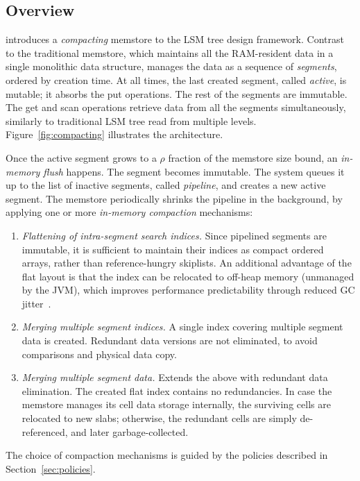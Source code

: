 \subsection{Overview}

\begin{figure*}
\caption{\bf{LSM architecture based on compacting memstore.}}
\label{fig:compacting}
\end{figure*}

\sys\/ introduces a {\em compacting\/} memstore to the LSM tree design framework. Contrast to the traditional memstore, 
which maintains all the RAM-resident data in a single monolithic data structure, \sys\/ manages the data as a sequence of 
{\em segments}, ordered by creation time. At all times, the last created segment, called {\em active}, is mutable; it absorbs 
the put operations. The rest of the segments are immutable. The get and scan operations retrieve data from all the segments 
simultaneously, similarly to traditional LSM tree read from multiple levels. Figure~\ref{fig:compacting} illustrates the architecture. 

Once the active segment grows to a $\rho$ fraction of the memstore size bound, an {\em in-memory flush} happens.
The segment becomes immutable. The system queues it up to the list of inactive segments, called {\em pipeline}, 
and creates a new active segment. The  memstore periodically shrinks the pipeline in the background, by applying 
one or more {\em in-memory compaction} mechanisms: 
\begin{enumerate}
\item {\em Flattening of intra-segment search indices.} Since pipelined segments are immutable, it is sufficient to maintain 
their indices as compact ordered arrays, rather than reference-hungry skiplists. An additional advantage of the flat layout 
is that the index can be relocated to off-heap memory (unmanaged by the JVM), which improves performance predictability 
through reduced GC jitter~\cite{alibabahbase}. 
\item {\em Merging multiple segment indices.} A single index covering multiple segment data is created. Redundant data 
versions are not eliminated, to avoid comparisons and physical data copy. 
\item  {\em Merging multiple segment data.} Extends the above with redundant data elimination. The created flat index 
contains no redundancies. In case the memstore manages its cell data storage internally, the surviving cells are relocated
to new slabs; otherwise, the redundant cells are simply de-referenced, and later garbage-collected.    
\end{enumerate} 
The choice of compaction mechanisms is guided by the policies described in Section~\ref{sec:policies}. 


